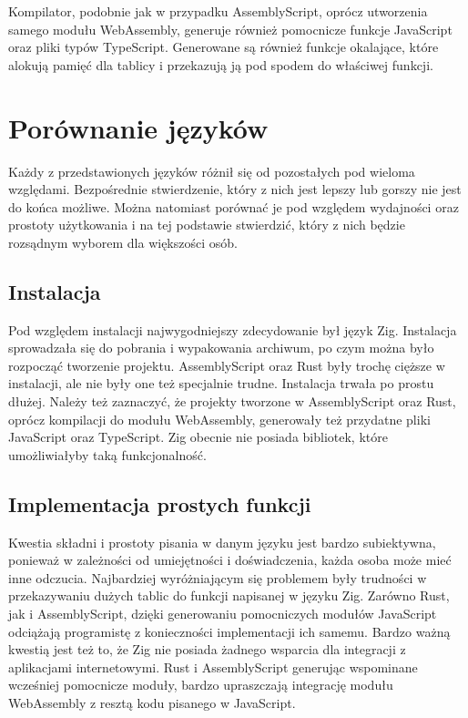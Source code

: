 \documentclass[language=polish,type=master]{aghmodern}
\begin{document}
Kompilator, podobnie jak w przypadku AssemblyScript, oprócz utworzenia samego modułu WebAssembly, generuje również pomocnicze funkcje JavaScript oraz pliki typów TypeScript.
Generowane są również funkcje okalające, które alokują pamięć dla tablicy i przekazują ją pod spodem do właściwej funkcji.

\section{Porównanie języków}
Każdy z przedstawionych języków różnił się od pozostałych pod wieloma względami.
Bezpośrednie stwierdzenie, który z nich jest lepszy lub gorszy nie jest do końca możliwe.
Można natomiast porównać je pod względem wydajności oraz prostoty użytkowania i na tej podstawie stwierdzić, który z nich będzie rozsądnym wyborem dla większości osób.

\subsection{Instalacja}
Pod względem instalacji najwygodniejszy zdecydowanie był język Zig.
Instalacja sprowadzała się do pobrania i wypakowania archiwum, po czym można było rozpocząć tworzenie projektu.
AssemblyScript oraz Rust były trochę cięższe w instalacji, ale nie były one też specjalnie trudne.
Instalacja trwała po prostu dłużej.
Należy też zaznaczyć, że projekty tworzone w AssemblyScript oraz Rust, oprócz kompilacji do modułu WebAssembly, generowały też przydatne pliki JavaScript oraz TypeScript.
Zig obecnie nie posiada bibliotek, które umożliwiałyby taką funkcjonalność.

\subsection{Implementacja prostych funkcji}
Kwestia składni i prostoty pisania w danym języku jest bardzo subiektywna, ponieważ w zależności od umiejętności i doświadczenia, każda osoba może mieć inne odczucia.
Najbardziej wyróżniającym się problemem były trudności w przekazywaniu dużych tablic do funkcji napisanej w języku Zig.
Zarówno Rust, jak i AssemblyScript, dzięki generowaniu pomocniczych modułów JavaScript odciążają programistę z konieczności implementacji ich samemu.
Bardzo ważną kwestią jest też to, że Zig nie posiada żadnego wsparcia dla integracji z aplikacjami internetowymi.
Rust i AssemblyScript generując wspominane wcześniej pomocnicze moduły, bardzo upraszczają integrację modułu WebAssembly z resztą kodu pisanego w JavaScript.
\end{document}
